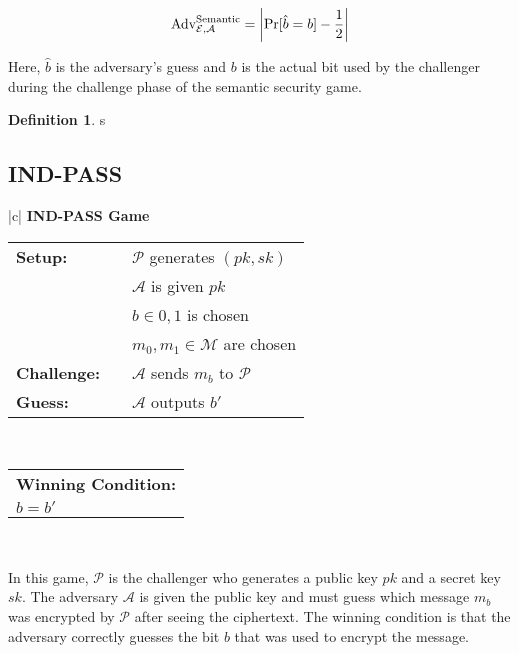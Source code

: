 \documentclass[12pt,openany]{book}
\theoremstyle{definition}
\newtheorem{definition}{Definition}[chapter]
\newcommand{\A}{\mathcal{A}}
\newcommand{\E}{\mathcal{E}}
\newcommand{\Adv}{\textnormal{Adv}}
\begin{document}
	\begin{align*}
	\Adv_{\E, \A}^{\text{Semantic}} = \left| \Pr[\hat{b} = b] - \frac{1}{2} \right|
	\end{align*}
	
	Here, $\hat{b}$ is the adversary's guess and $b$ is the actual bit used by the challenger during the challenge phase of the semantic security game.
	
	
	\begin{tcolorbox}[colback=white,colframe=defcolor, title={\color{white}\bf Semantic Secure}]
		\begin{definition}
			s
		\end{definition}
	\end{tcolorbox}
	\subsection{IND-PASS}
	\begin{center}
		\begin{tabular}{|c|}
			\hline
			\textbf{IND-PASS Game} \\
			\hline
			\begin{tabular}{lcl}
				\textbf{Setup:} & & $\mathcal{P}$ generates $(pk,sk)$ \\
				& & $\mathcal{A}$ is given $pk$ \\
				& & $b \in {0,1}$ is chosen \\
				& & $m_0,m_1 \in \mathcal{M}$ are chosen \\
				\textbf{Challenge:} & & $\mathcal{A}$ sends $m_b$ to $\mathcal{P}$ \\
				\textbf{Guess:} & & $\mathcal{A}$ outputs $b'$ \\
			\end{tabular} \\
			\hline
			\begin{tabular}{l}
				\textbf{Winning Condition:} \\
				$b=b'$ \\
			\end{tabular} \\
			\hline
		\end{tabular}
	\end{center}
	
	In this game, $\mathcal{P}$ is the challenger who generates a public key $pk$ and a secret key $sk$. The adversary $\mathcal{A}$ is given the public key and must guess which message $m_b$ was encrypted by $\mathcal{P}$ after seeing the ciphertext. The winning condition is that the adversary correctly guesses the bit $b$ that was used to encrypt the message.
\end{document}
